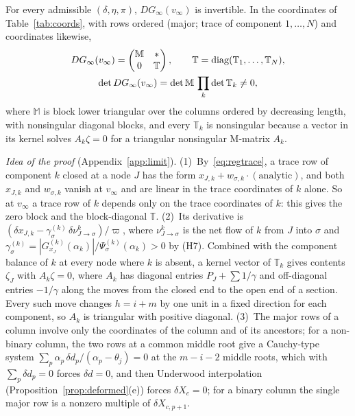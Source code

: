 \documentclass[11pt,a4paper]{report}
\newcommand{\piv}{\varpi}
\newcommand{\Mm}{\mathbb M}
\newcommand{\Tm}{\mathbb T}
\begin{document}
\begin{theorem}\label{thm:L}
For every admissible \((\delta,\eta,\pi)\), \(DG_\infty(v_\infty)\) is invertible. In the coordinates of Table~\ref{tab:coords},
with rows ordered (major; trace of component \(1,\dots,N\)) and coordinates likewise,
\begin{gather*}
DG_\infty(v_\infty)=\begin{pmatrix}\Mm&*\\0&\Tm\end{pmatrix},\qquad\Tm=\diag(\Tm_1,\dots,\Tm_N),\\
\det DG_\infty(v_\infty)=\det\Mm\,\prod_k\det\Tm_k\ne0 ,
\end{gather*}
where \(\Mm\) is block lower triangular over the columns ordered by decreasing length, with nonsingular diagonal blocks, and
every \(\Tm_k\) is nonsingular because a vector in its kernel solves \(A_k\zeta=0\) for a triangular nonsingular M-matrix
\(A_k\).
\end{theorem}

\emph{Idea of the proof} (Appendix~\ref{app:limit}). (1)~By~\eqref{eq:regtrace}, a trace row of component \(k\) closed at a node
\(J\) has the form \(x_{J,k}+w_{\sigma,k}\cdot(\text{analytic})\), and both \(x_{J,k}\) and \(w_{\sigma,k}\) vanish at \(v_\infty\) and are
linear in the trace coordinates of \(k\) alone. So at \(v_\infty\) a trace row of \(k\) depends only on the trace coordinates of \(k\):
this gives the zero block and the block-diagonal \(\Tm\). (2)~Its derivative is
\((\delta x_{J,k}-\gamma^{(k)}_\sigma\,\delta\nu^k_{J\to\sigma})/\piv\), where \(\nu^k_{J\to\sigma}\) is the net flow of \(k\) from \(J\) into
\(\sigma\) and \(\gamma^{(k)}_\sigma=|G^{(k)}_{x_J}(\alpha_k)|/\Psi^{(k)}_\sigma(\alpha_k)>0\) by (H7). Combined with the component
balance of \(k\) at every node where \(k\) is absent, a kernel vector of \(\Tm_k\) gives contents \(\zeta_J\) with \(A_k\zeta=0\), where
\(A_k\) has diagonal entries \(P_J+\sum1/\gamma\) and off-diagonal entries \(-1/\gamma\) along the moves from the closed end to the
open end of a section. Every such move changes \(h=i+m\) by one unit in a fixed direction for each component, so \(A_k\) is
triangular with positive diagonal. (3)~The major rows of a column involve only the coordinates of the column and of its
ancestors; for a non-binary column, the two rows at a common middle root give a Cauchy-type system
\(\sum_p\alpha_p\,\delta d_p/(\alpha_p-\theta_j)=0\) at the \(m-i-2\) middle roots, which with \(\sum_p\delta d_p=0\) forces \(\delta d=0\), and
then Underwood interpolation (Proposition~\ref{prop:deformed}(e)) forces \(\delta X_c=0\); for a binary column the single major row
is a nonzero multiple of \(\delta X_{c,p+1}\).
\end{document}
